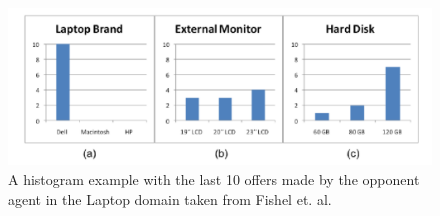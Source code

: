 \documentclass[a4paper,11pt]{article}
\theoremstyle{mytheor}
\begin{document}
\begin{figure}[h!]
  \centering
  \includegraphics[width=0.75\linewidth]{report2/example_histogram.png}
  \caption{A histogram example with the last 10 offers made by the opponent agent in the Laptop domain taken from Fishel et. al.\cite{Fishel2013}}
  \label{fig:preferences}
\end{figure}


\clearpage


\end{document}
